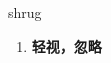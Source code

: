 
\begin{frame}
{\huge shrug}
\begin{center}
\begin{enumerate}\Large
  \item \textbf{轻视，忽略}
\end{enumerate}
\end{center}
\end{frame}
